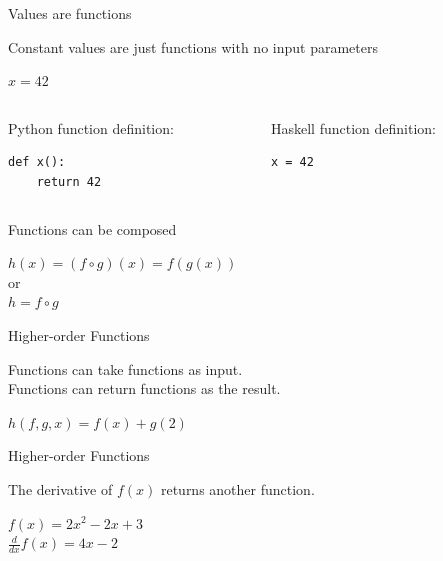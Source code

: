\documentclass[mathserif]{beamer}
\begin{document}
\begin{frame}[fragile]{Values are functions}

  {\large Constant values are just functions with no input parameters}

  \vskip5mm
  {\Huge $x = 42$}
  \vskip10mm

  \begin{columns}[t]
    \begin{column}[T]{5cm}
      Python function definition:
      \begin{verbatim}
def x():
    return 42
      \end{verbatim}
    \end{column}

    \begin{column}[T]{5cm}
       Haskell function definition:
       \begin{verbatim}
x = 42
       \end{verbatim}
    \end{column}
  \end{columns}
\end{frame}

\begin{frame}{Functions can be composed}

  {\Huge $h(x) = (f \circ g)(x) = f(g(x))$\\
  \vskip5mm
  or\\
  \vskip5mm
  $h = f \circ g$}

\end{frame}

\begin{frame}{Higher-order Functions}

  {\Large Functions can take functions as input.}\\
  {\Large Functions can return functions as the result.}

  \vskip5mm

  {\Huge $h(f, g, x) = f(x) + g(2)$}

\end{frame}

\begin{frame}{Higher-order Functions}

  {\Large The derivative of $f(x)$ returns another function.}

  \vskip5mm

  {\Large $f(x) = 2x^2 - 2x + 3$}\\
  {\Large $\frac{d}{dx} f(x) = 4x - 2$}


\end{frame}
\end{document}
